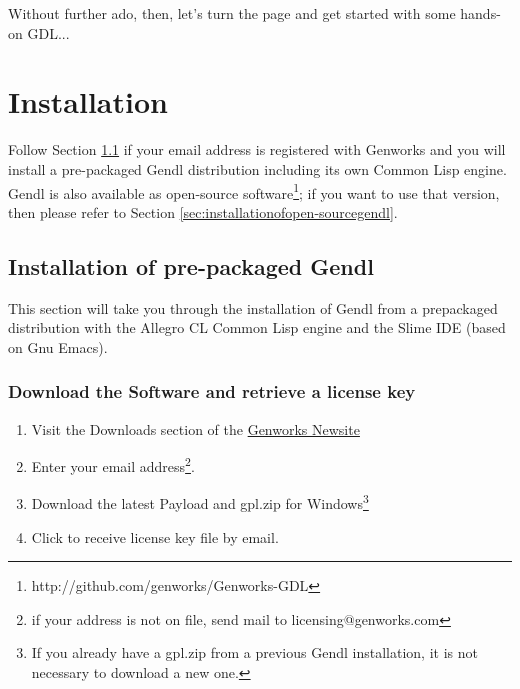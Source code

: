 \documentclass [11pt]{book}
\begin{document}
Without further ado, then, let's turn the page and get started with some hands-on GDL...

\chapter{Installation}

\label{chap:installation}

Follow Section 
\ref{sec:installationofpre-packagedgendl} if your email address is registered with Genworks and you will
install a pre-packaged Gendl distribution including its own Common
Lisp engine.  Gendl is also available as open-source software\footnote{http://github.com/genworks/Genworks-GDL}; if you
want to use that version, then please refer to Section 
\ref{sec:installationofopen-sourcegendl}.

\section{Installation of pre-packaged Gendl}

\label{sec:installationofpre-packagedgendl}

This section will take you through the installation of Gendl
from a prepackaged distribution with the Allegro CL Common Lisp engine
and the Slime IDE (based on Gnu Emacs).

\subsection{Download the Software and retrieve a license key}

\label{subsec:downloadthesoftwareandretrievealicensekey}



\begin{enumerate}

\item Visit the Downloads section of the \href{http://genworks.com/newsite}{Genworks Newsite}

\item Enter your email address\footnote{if your address is not on file, send mail to licensing@genworks.com}.

\item Download the latest Payload and gpl.zip for Windows\footnote{If you already have a gpl.zip from a previous Gendl installation, it is not necessary to download a new one.}

\item Click to receive license key file by email.

\end{enumerate}
\end{document}
